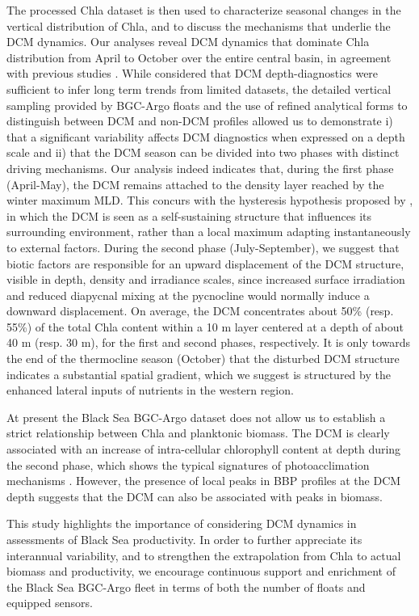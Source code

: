 \documentclass[journal abbreviation, manuscript]{copernicus}
\begin{document}
The processed Chla dataset is then used to
characterize seasonal changes in the vertical distribution of Chla, and to discuss the mechanisms that underlie the DCM dynamics.
Our analyses reveal DCM dynamics that dominate Chla distribution from April to October over the entire central basin, in agreement with previous studies \citep{Yunev2005,Finenko2005}.
While \citet{Yunev2005} considered that DCM depth-diagnostics were sufficient to infer long term trends from limited datasets, the detailed vertical sampling provided by BGC-Argo floats and the use of refined analytical forms to distinguish between DCM and non-DCM profiles allowed us to demonstrate i) that a significant variability affects DCM diagnostics when expressed on a depth scale and ii) that the DCM season can be divided into two phases with distinct driving mechanisms.
Our analysis indeed indicates that, during the first phase (April-May), the DCM remains attached to the density layer reached by the winter maximum MLD.
This concurs with the hysteresis hypothesis proposed by \citet{Navarro2013}, in which the DCM is seen as a self-sustaining structure that influences its surrounding environment, rather than a local maximum adapting instantaneously to external factors. 
During the second phase (July-September), we suggest that biotic factors are responsible for an upward displacement of the DCM structure, visible in depth, density and irradiance scales, since increased surface irradiation and reduced diapycnal mixing at the pycnocline would normally induce a downward displacement.
On average, the DCM concentrates about 50\% (resp. 55\%) of the total Chla content within a 10 \unit{m} layer centered at a depth of about 40 \unit{m} (resp. 30 \unit{m}), for the first and second phases, respectively.  
It is only towards the end of the thermocline season (October) that the disturbed DCM structure indicates a substantial spatial gradient, which we suggest is structured by the enhanced lateral inputs of nutrients in the western region.

At present the Black Sea BGC-Argo dataset does not allow us to establish a strict relationship between Chla and planktonic biomass. 
The DCM is clearly associated with an increase of intra-cellular chlorophyll content at depth during the second phase, which shows the typical signatures of photoacclimation mechanisms \citep{Fennel2003}.
However, the presence of local peaks in BBP profiles at the DCM depth suggests that the DCM can also be associated with peaks in biomass.  

This study highlights the importance of considering DCM dynamics in assessments of Black Sea productivity.
In order to further appreciate its interannual variability, and to strengthen the extrapolation from Chla to actual biomass and productivity, we encourage continuous support and enrichment of the Black Sea BGC-Argo fleet in terms of both the number of floats and equipped sensors. 
\end{document}
